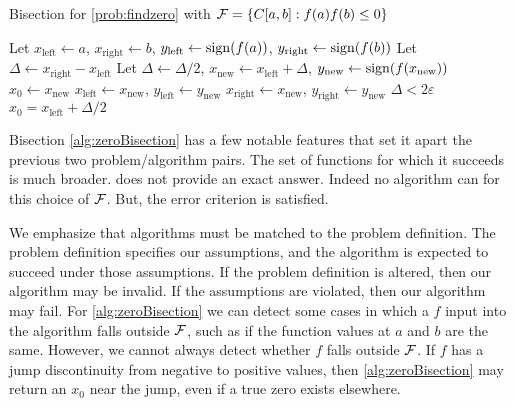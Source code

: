 \begin{algorithm}
\caption{Bisection for \cref{prob:findzero} with $\mathcal{F} = \{C[a,b] : f(a)f(b) \le 0\}$  \label{alg:zeroBisection}}
	\begin{algorithmic}
    \State Let $x_{\text{left}} \leftarrow a$, $x_{\text{right}} \leftarrow b$, $y_{\text{left}} \leftarrow \operatorname{sign}(f(a))$, $y_{\text{right}} \leftarrow \operatorname{sign}(f(b))$
    \State Let $\Delta \leftarrow x_{\text{right}}- x_{\text{left}}$
    \Repeat {}
    \State Let $\Delta \leftarrow \Delta/2$, $x_{\text{new}} \leftarrow x_{\text{left}} + \Delta$, $y_{\text{new}} \leftarrow \operatorname{sign}(f(x_{\text{new}}))$
    \RETURN $x_0 \leftarrow x_\text{new}$
    \State $x_{\text{left}} \leftarrow x_{\text{new}}$, $y_{\text{left}} \leftarrow y_{\text{new}}$
    \Else
        \State $x_{\text{right}} \leftarrow x_{\text{new}}$, $y_{\text{right}} \leftarrow y_{\text{new}}$
    \EndIf
    \Until $\Delta < 2\varepsilon$
    \RETURN $x_0 = x_{\text{left}} + \Delta/2$

    \end{algorithmic}
\end{algorithm}

Bisection \cref{alg:zeroBisection} has a few notable features that set it apart the previous two problem/algorithm pairs.  The set of functions for which it succeeds is much broader.    does not provide an exact answer.  Indeed no algorithm can for this choice of $\mathcal{F}$. But, the error criterion is satisfied. 

We emphasize that algorithms must be matched to the problem definition.  The problem definition specifies our assumptions, and the algorithm is expected to succeed under those assumptions.  If the problem definition is altered, then our algorithm may be invalid.  If the assumptions are violated, then our algorithm may fail.  For \cref{alg:zeroBisection} we can detect some cases in which a $f$ input into the algorithm falls outside $\mathcal{F}$, such as if the function values at $a$ and $b$ are the same.  However, we cannot always detect whether $f$ falls outside $\mathcal{F}$.  If $f$ has a jump discontinuity from negative to positive values, then \cref{alg:zeroBisection} may return an $x_0$ near the jump, even if a true zero exists elsewhere.

